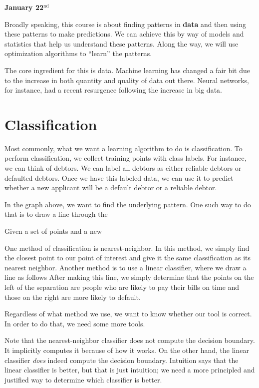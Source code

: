 \textbf{January 22$^{\text{nd}}$}

Broadly speaking, this course is about finding patterns in \textbf{data} and then using these patterns to make predictions.
We can achieve this by way of models and statistics that help us understand these patterns.
Along the way, we will use optimization algorithms to ``learn'' the patterns.

The core ingredient for this is data.
Machine learning has changed a fair bit due to the increase in both quantity and quality of data out there.
Neural networks, for instance, had a recent resurgence following the increase in big data.

\section{Classification}
Most commonly, what we want a learning algorithm to do is classification.
To perform classification, we collect training points with class labels.
For instance, we can think of debtors.
We can label all debtors as either reliable debtors or defaulted debtors.
Once we have this labeled data, we can use it to predict whether a new applicant will be a default debtor or a reliable debtor.


In the graph above, we want to find the underlying pattern.
One such way to do that is to draw a line through the 


Given a set of points and a new 

One method of classification is nearest-neighbor.
In this method, we simply find the closest point to our point of interest and give it the same classification as its nearest neighbor.
Another method is to use a linear classifier, where we draw a line as follows
After making this line, we simply determine that the points on the left of the separation are people who are likely to pay their bills on time and those on the right are more likely to default.

Regardless of what method we use, we want to know whether our tool is correct.
In order to do that, we need some more tools.

Note that the nearest-neighbor classifier does not compute the decision boundary.
It implicitly computes it because of how it works.
On the other hand, the linear classifier \textit{does} indeed compute the decision boundary.
Intuition says that the linear classifier is better, but that is just intuition;
we need a more principled and justified way to determine which classifier is better.

